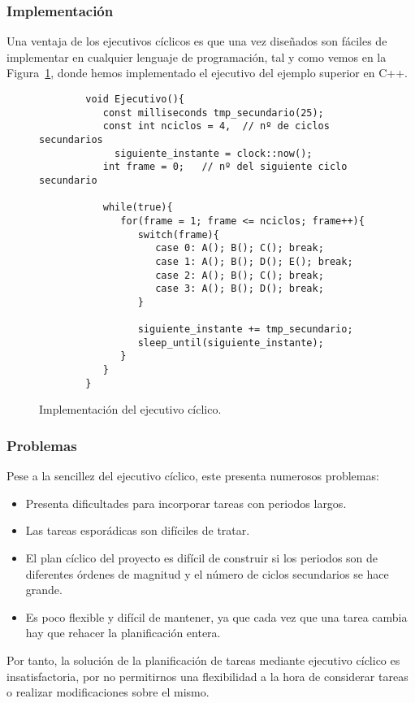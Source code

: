 \subsubsection{Implementación}
Una ventaja de los ejecutivos cíclicos es que una vez diseñados son fáciles de implementar en cualquier lenguaje de programación, tal y como vemos en la Figura~\ref{cod:ejecutivo}, donde hemos implementado el ejecutivo del ejemplo superior en C++.
    \begin{figure}[H]
    \centering
    \begin{verbatim}
        void Ejecutivo(){
           const milliseconds tmp_secundario(25);
           const int nciclos = 4,  // nº de ciclos secundarios
             siguiente_instante = clock::now();  
           int frame = 0;   // nº del siguiente ciclo secundario

           while(true){
              for(frame = 1; frame <= nciclos; frame++){
                 switch(frame){
                    case 0: A(); B(); C(); break;
                    case 1: A(); B(); D(); E(); break;
                    case 2: A(); B(); C(); break;
                    case 3: A(); B(); D(); break;
                 }

                 siguiente_instante += tmp_secundario;
                 sleep_until(siguiente_instante);
              }
           }
        }
    \end{verbatim}
    \caption{Implementación del ejecutivo cíclico.}
    \label{cod:ejecutivo}
    \end{figure}
\subsubsection{Problemas}
Pese a la sencillez del ejecutivo cíclico, este presenta numerosos problemas:
\begin{itemize}
    \item Presenta dificultades para incorporar tareas con periodos largos.
    \item Las tareas esporádicas son difíciles de tratar.
    \item El plan cíclico del proyecto es difícil de construir si los periodos son de diferentes órdenes de magnitud y el número de ciclos secundarios se hace grande.
    \item Es poco flexible y difícil de mantener, ya que cada vez que una tarea cambia hay que rehacer la planificación entera.
\end{itemize}
Por tanto, la solución de la planificación de tareas mediante ejecutivo cíclico es insatisfactoria, por no permitirnos una flexibilidad a la hora de considerar tareas o realizar modificaciones sobre el mismo.\\

